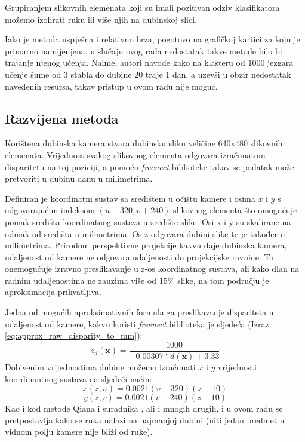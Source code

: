 \documentclass[times, utf8, diplomski, numeric]{fer}
\begin{document}
Grupiranjem slikovnih elemenata koji su imali pozitivan odziv klasifikatora možemo izolirati ruku ili više njih na dubinskoj slici.

Iako je metoda uspješna i relativno brza, pogotovo na grafičkoj kartici za koju je primarno namijenjena, u slučaju ovog rada nedostatak takve metode bilo bi trajanje njenog učenja. Naime, autori navode kako na klasteru od 1000 jezgara učenje šume od 3 stabla do dubine 20 traje 1 dan, a uzevši u obzir nedostatak navedenih resursa, takav pristup u ovom radu nije moguć.

\subsection{Razvijena metoda}

Korištena dubinska kamera stvara dubinsku sliku veličine 640x480 slikovnih elemenata. Vrijednost svakog slikovnog elementa odgovara izračunatom disparitetu na toj poziciji, a pomoću \textit{freenect} biblioteke takav se podatak može pretvoriti u dubinu danu u milimetrima.

Definiran je koordinatni sustav sa središtem u očištu kamere i osima $x$ i $y$ s odgovarajućim indeksom $(u+320,v+240)$ slikovnog elementa što omogućuje pomak središta koordinatnog sustava u središte slike. Osi x i y su skalirane na odmak od središta u milimetrima. Os z odgovara dubini slike te je također u milimetrima. Prirodom perspektivne projekcije kakvu daje dubinska kamera, udaljenost od kamere ne odgovara udaljenosti do projekcijske ravnine. To onemogućuje izravno preslikavanje u z-os koordinatnog sustava, ali kako dlan na radnim udaljenostima ne zauzima više od 15\% slike, na tom području je aproksimacija prihvatljiva.

Jedna od mogućih aproksimativnih formula za preslikavanje dispariteta u udaljenost od kamere, kakvu koristi \textit{freenect} biblioteka \cite{openkinect} je sljedeća (Izraz \ref{eq:approx_raw_disparity_to_mm}):
\begin{equation}
	\label{eq:approx_raw_disparity_to_mm}
	z_{d}(\mathbf{x})=\frac{1000}{-0.00307*d(\mathbf{x})+3.33}
\end{equation}
Dobivenim vrijednostima dubine možemo izračunati $x$ i $y$ vrijednosti koordinantnog sustava na sljedeći način:
\begin{equation}
	\label{eq:raw_disparity_to_mm_x}
	    x(z,u)=0.0021(v - 320)(z-10) 
\end{equation}
\begin{equation}
	\label{eq:raw_disparity_to_mm_y}
	    y(z,v)=0.0021(v - 240)(z-10)
\end{equation}
Kao i kod metode Qiana i suradnika \cite{qian2014realtime}, ali i mnogih drugih, i u ovom radu se pretpostavlja kako se ruka nalazi na najmanjoj dubini (niti jedan predmet u vidnom polju kamere nije bliži od ruke).
\end{document}
